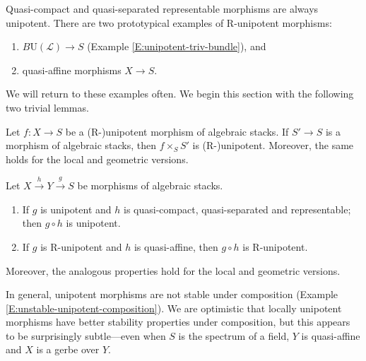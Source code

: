\documentclass[reqno,a4paper]{amsart}
\numberwithin{Theorem}{section}
\renewcommand{\U}{\mathrm{U}}
\theoremstyle{plain}
\theoremstyle{remark}
\newcommand{\classB}{B}
\begin{document}
Quasi-compact and quasi-separated representable morphisms are always unipotent. There are two
prototypical examples of R-unipotent morphisms:
\begin{enumerate}
\item $\classB \U(\mathscr{L}) \to S$ (Example
  \ref{E:unipotent-triv-bundle}), and
\item quasi-affine morphisms $X\to S$.
\end{enumerate}
We will return to these examples often. 
We begin this section with the
following two trivial lemmas.
\begin{lemma}\label{L:basechange-unipotent}
  Let $f \colon X \to S$ be a (R-)unipotent morphism of algebraic
  stacks. If $S' \to S$ is a morphism of algebraic stacks, then
  $f\times_S S'$ is (R-)unipotent. Moreover, the same holds for the
  local and geometric versions.
\end{lemma}
\begin{lemma}\label{L:restriction-flag}
  Let $X \xrightarrow{h} Y \xrightarrow{g} S$ be 
  morphisms of algebraic stacks.
  \begin{enumerate}
  \item\label{LI:restriction-flag:uni} If $g$ is unipotent and $h$ is quasi-compact, quasi-separated and representable; then
    $g\circ h$ is unipotent.
  \item\label{LI:restriction-flag:Runi} If $g$ is R-unipotent and $h$
    is quasi-affine, then $g\circ h$ is R-unipotent.
  \end{enumerate}
  Moreover, the analogous properties hold for the local and geometric
  versions.
\end{lemma}
In general, unipotent morphisms are not stable under composition
(Example \ref{E:unstable-unipotent-composition}). We are optimistic
that locally unipotent morphisms have better stability properties under composition, but
this appears to be surprisingly subtle---even when $S$ is the spectrum
of a field, $Y$ is quasi-affine and $X$ is a gerbe over $Y$.
\end{document}
